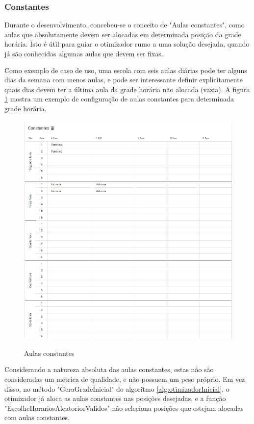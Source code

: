 \subsubsection{Constantes}

Durante o desenvolvimento, concebeu-se o conceito de "Aulas constantes", como aulas que absolutamente devem ser alocadas em determinada posição da grade horária. Isto é útil para guiar o otimizador rumo a uma solução desejada, quando já são conhecidas algumas aulas que devem ser fixas. 

Como exemplo de caso de uso, uma escola com seis aulas diárias pode ter alguns dias da semana com menos aulas, e pode ser interessante definir explicitamente quais dias devem ter a última aula da grade horária não alocada (vazia). A figura \ref{fig:constantes} mostra um exemplo de configuração de aulas constantes para determinada grade horária.

\begin{figure}[!htb]
	\centering
	\caption{Aulas constantes}
	\includegraphics[width=1\textwidth]{./dados/figuras/constantes}
	\label{fig:constantes}
\end{figure}
\pagebreak

Considerando a natureza absoluta das aulas constantes, estas não são consideradas um métrica de qualidade, e não possuem um peso próprio. Em vez disso, no método "GeraGradeInicial" do algoritmo \ref{alg:otimizadorInicial}, o otimizador já aloca as aulas constantes nas posições desejadas, e a função "EscolheHorariosAleatoriosValidos" não seleciona posições que estejam alocadas com aulas constantes.

